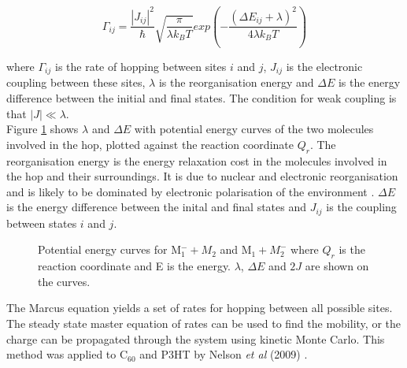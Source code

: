 \documentclass[a4paper,12pt]{article}
\begin{document}
\begin{equation}
\Gamma_{ij} = \frac{|J_{ij}|^2}{\hbar} \sqrt{\frac{\pi}{\lambda k_B T}} exp \left ( - \frac{(\Delta E_{ij} + \lambda ) ^2}{4\lambda k_B T} \right)
\end{equation}

\noindent where $\Gamma_{ij}$ is the rate of hopping between sites $i$ and $j$, $J_{ij}$ is the electronic coupling between these sites, $\lambda$ is the reorganisation energy and $\Delta E$ is the energy difference between the initial and final states. The condition for weak coupling is that $|J|\ll \lambda$. \\

\noindent Figure \ref{fig:Marcus} shows $\lambda$ and $\Delta E$ with potential energy curves of the two molecules involved in the hop, plotted against the reaction coordinate $Q_r$. The reorganisation energy is the energy relaxation cost in the molecules involved in the hop and their surroundings. It is due to nuclear and electronic reorganisation and is likely to be dominated by electronic polarisation of the environment \cite{Nelson2009}. $\Delta E$ is the energy difference between the inital and final states and $J_{ij}$ is the coupling between states $i$ and $j$.

\begin{figure}[H]
\centering
{}
\caption{Potential energy curves for M$_1^- + M_2$ and M$_1+M_2^-$ where $Q_r$ is the reaction coordinate and E is the energy. $\lambda$, $\Delta E$ and $2J$ are shown on the curves.}
\label{fig:Marcus}
\end{figure}

\noindent The Marcus equation yields a set of rates for hopping between all possible sites. The steady state master equation of rates can be used to find the mobility, or the charge can be propagated through the system using kinetic Monte Carlo. This method was applied to C$_{60}$ and P3HT by Nelson \textit{et al} (2009) \cite{Nelson2009}. \\
\end{document}
